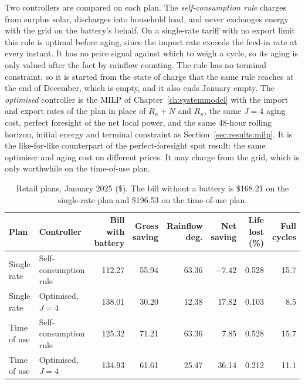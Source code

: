 Two controllers are compared on each plan. The \emph{self-consumption rule} charges from
surplus solar, discharges into household load, and never exchanges energy with the grid
on the battery's behalf. On a single-rate tariff with no export limit this rule is
optimal before aging, since the import rate exceeds the feed-in rate at every instant.
It has no price signal against which to weigh a cycle, so its aging is only valued after
the fact by rainflow counting. The rule has no terminal constraint, so it is started
from the state of charge that the same rule reaches at the end of December, which is
empty, and it also ends January empty. The \emph{optimised} controller is the MILP of
Chapter~\ref{ch:systemmodel} with the import and export rates of the plan in place of
$R_n + N$ and $R_n$, the same $J = 4$ aging cost, perfect foresight of the net local
power, and the same 48-hour rolling horizon, initial energy and terminal constraint as
Section~\ref{sec:results:milp}. It is the like-for-like counterpart of the
perfect-foresight spot result: the same optimiser and aging cost on different prices.
It may charge from the grid, which is only worthwhile on the time-of-use plan.

\begin{table}[htbp]
    \centering
    \small
    \caption{Retail plans, January 2025 (\$). The bill without a battery is \$168.21 on
    the single-rate plan and \$196.53 on the time-of-use plan.}
    \label{tab:retail}
    \begin{tabular}{@{}llrrrrrr@{}}
        \toprule
        Plan & Controller & \shortstack{Bill with\\battery} & \shortstack{Gross\\saving} &
        \shortstack{Rainflow\\deg.} & \shortstack{Net\\saving} & \shortstack{Life\\lost (\%)} &
        \shortstack{Full\\cycles} \\
        \midrule
        Single rate & Self-consumption rule & 112.27 & 55.94 & 63.36 & $-7.42$ & 0.528 & 15.7 \\
        Single rate & Optimised, $J=4$      & 138.01 & 30.20 & 12.38 & 17.82   & 0.103 & 8.5 \\
        Time of use & Self-consumption rule & 125.32 & 71.21 & 63.36 & 7.85    & 0.528 & 15.7 \\
        Time of use & Optimised, $J=4$      & 134.93 & 61.61 & 25.47 & 36.14   & 0.212 & 11.1 \\
        \bottomrule
    \end{tabular}
\end{table}


